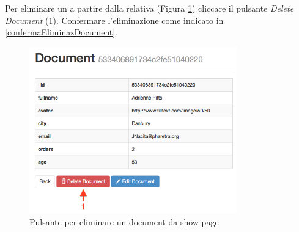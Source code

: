 			Per eliminare un  a partire dalla relativa  (Figura \ref{fig:eliminazionedocumentdashowpage}) cliccare il pulsante \emph{Delete Document} (1). Confermare l'eliminazione come indicato in \ref{confermaEliminazDocument}.

				\begin{figure}[H]
					\centering \includegraphics[width=0.8\textwidth]{img/eliminazionedocumentdashowpage.png}
				\caption{\label{fig:eliminazionedocumentdashowpage} Pulsante per eliminare un document da show-page}
				\end{figure}

